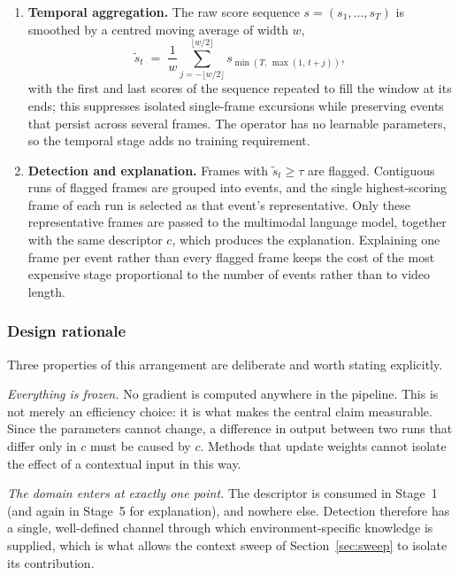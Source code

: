 \documentclass[a4paper,fleqn]{cas-sc}
\begin{document}
\begin{enumerate}[{Stage}~1.]
  \item \textbf{Temporal aggregation.} The raw score sequence
        $s = (s_1,\dots,s_T)$ is smoothed by a centred moving average of width
        $w$,
        \begin{equation}
        \tilde{s}_t \;=\; \frac{1}{w}\sum_{j=-\lfloor w/2\rfloor}^{\lfloor w/2\rfloor}
                          s_{\min(T,\,\max(1,\,t+j))},
        \label{eq:smooth}
        \end{equation}
        with the first and last scores of the sequence repeated to fill the window at
        its ends; this suppresses isolated single-frame excursions while preserving
        events that persist across several frames. The operator has no learnable
        parameters, so the temporal stage adds no training requirement.

  \item \textbf{Detection and explanation.} Frames with
        $\tilde{s}_t \ge \tau$ are flagged. Contiguous runs of flagged frames are
        grouped into events, and the single highest-scoring frame of each run is
        selected as that event's representative. Only these representative frames
        are passed to the multimodal language model, together with the same
        descriptor $c$, which produces the explanation. Explaining one frame per
        event rather than every flagged frame keeps the cost of the most
        expensive stage proportional to the number of events rather than to video
        length.
\end{enumerate}

\subsubsection{Design rationale}
Three properties of this arrangement are deliberate and worth stating explicitly.

\emph{Everything is frozen.} No gradient is computed anywhere in the pipeline.
This is not merely an efficiency choice: it is what makes the central claim
measurable. Since the parameters cannot change, a difference in output between
two runs that differ only in $c$ must be caused by $c$. Methods that update
weights cannot isolate the effect of a contextual input in this way.

\emph{The domain enters at exactly one point.} The descriptor is consumed in
Stage~1 (and again in Stage~5 for explanation), and nowhere else. Detection
therefore has a single, well-defined channel through which environment-specific
knowledge is supplied, which is what allows the context sweep of
Section~\ref{sec:sweep} to isolate its contribution.
\end{document}
